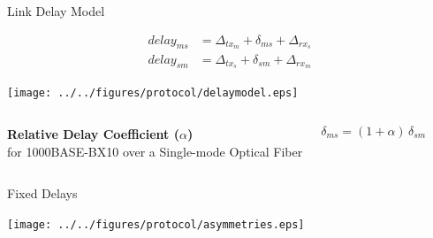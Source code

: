 \documentclass[compress,red]{beamer}
\begin{document}
\begin{frame}{Link Delay Model}

  \begin{align}
    \nonumber delay_{ms} &= \Delta_{tx_m} + \delta_{ms} + \Delta_{rx_s} \\
    \nonumber delay_{sm} &= \Delta_{tx_s} + \delta_{sm} + \Delta_{rx_m}
  \end{align}

   \vspace{0.2cm}

  \begin{center}
  \texttt{[image: ../../figures/protocol/delaymodel.eps]}
  \end{center}

\begin{columns}[c]
  \column{2.8in}

    \begin{center}
      \textbf{Relative Delay Coefficient ($\alpha$)} \\
      for 1000BASE-BX10 over a Single-mode Optical Fiber
    \end{center}

  \column{1.5in}
    \begin{center}
      \begin{equation}
      \nonumber \delta_{ms} = (1 + \alpha) \, \delta_{sm}
      \end{equation}
    \end{center}
    \vspace{0.5cm}
\end{columns}
  
\end{frame}
\begin{frame}{Fixed Delays}

  \begin{center}
  \texttt{[image: ../../figures/protocol/asymmetries.eps]}
  \end{center}

\end{frame}
\end{document}
